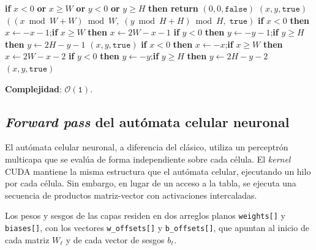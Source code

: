 \begin{breakablealgorithm}
\caption{ApplyBoundary: cuatro variantes especializadas en compilación}
\label{alg:frontera}
\footnotesize
\begin{algorithmic}[1]
    \State \textbf{if} $x < 0$ \textbf{or} $x \geq W$ \textbf{or} $y < 0$ \textbf{or} $y \geq H$ \textbf{then return} $(0, 0, \texttt{false})$
    \State \Return $(x, y, \texttt{true})$
\EndFunction
\Statex
{}
    \State \Return $((x \bmod W + W) \bmod W,\; (y \bmod H + H) \bmod H,\; \texttt{true})$
\EndFunction
\Statex
{}
    \State \textbf{if} $x < 0$ \textbf{then} $x \gets -x - 1$;\quad \textbf{if} $x \geq W$ \textbf{then} $x \gets 2W - x - 1$
    \State \textbf{if} $y < 0$ \textbf{then} $y \gets -y - 1$;\quad \textbf{if} $y \geq H$ \textbf{then} $y \gets 2H - y - 1$
    \State \Return $(x, y, \texttt{true})$
\EndFunction
\Statex
{}
    \State \textbf{if} $x < 0$ \textbf{then} $x \gets -x$;\quad \textbf{if} $x \geq W$ \textbf{then} $x \gets 2W - x - 2$
    \State \textbf{if} $y < 0$ \textbf{then} $y \gets -y$;\quad \textbf{if} $y \geq H$ \textbf{then} $y \gets 2H - y - 2$
    \State \Return $(x, y, \texttt{true})$
\EndFunction
\end{algorithmic}
\end{breakablealgorithm}

\textbf{Complejidad}: $\mathcal{O}(\texttt{1})$.

\subsection{\textit{Forward pass} del autómata celular neuronal}

El autómata celular neuronal, a diferencia del clásico, utiliza un perceptrón multicapa que se evalúa de forma independiente sobre cada célula. El \textit{kernel} CUDA mantiene la misma estructura que el autómata celular, ejecutando un hilo por cada célula. Sin embargo, en lugar de un acceso a la tabla, se ejecuta una secuencia de productos matriz-vector con activaciones intercaladas.

Los pesos y sesgos de las capas residen en dos arreglos planos \texttt{weights[]} y \texttt{biases[]}, con los vectores \texttt{w\_offsets[]} y \texttt{b\_offsets[]}, que apuntan al inicio de cada matriz $W_\ell$ y de cada vector de sesgos $b_\ell$. 

